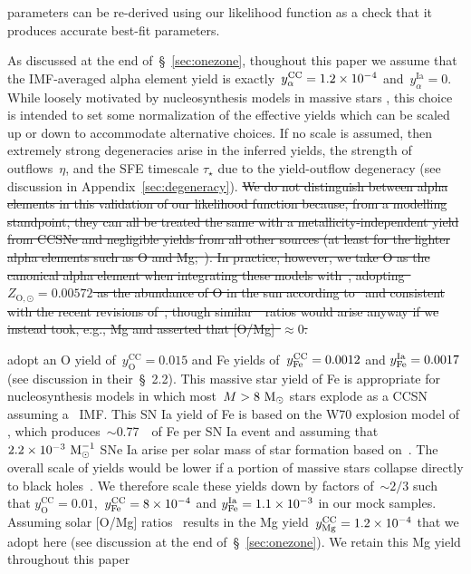 \documentclass[foo.tex]{subfiles}
\begin{document}
parameters can be re-derived using our likelihood function as a check that it
produces accurate best-fit parameters.
\par
As discussed at the end of~\S~\ref{sec:onezone}, thoughout this paper we assume
that the IMF-averaged alpha element yield is exactly~$y_\alpha^\text{CC} = 1.2\times10^{-4}$
and~$y_\alpha^\text{Ia} = 0$.
While loosely motivated by nucleosynthesis models in massive stars
\citep[e.g.,][]{Nomoto2013, Sukhbold2016, Limongi2018}, this choice is intended
to set some normalization of the effective yields which can be scaled up or
down to accommodate alternative choices.
If no scale is assumed, then extremely strong degeneracies arise in the
inferred yields, the strength of outflows~$\eta$, and the SFE timescale
$\tau_\star$ due to the yield-outflow degeneracy (see discussion in
Appendix~\ref{sec:degeneracy}).
{\color{red}
\hypersetup{draft}
\st{
We do not distinguish between alpha elements in this validation of our
likelihood function because, from a modelling standpoint, they can all be
treated the same with a metallicity-independent yield from CCSNe and negligible
yields from all other sources (at least for the lighter alpha elements such as
O and Mg;~\mbox{\citealp{Johnson2019}}).
In practice, however, we take O as the canonical alpha element when integrating
these models with~\vice, adopting~$Z_{\text{O},\odot} = 0.00572$ as the
abundance of O in the sun according to~\mbox{\citet{Asplund2009}} and consistent with
the recent revisions of~\mbox{\citet*{Asplund2021}}, though similar~\afe~ratios would
arise anyway if we instead took, e.g., Mg and asserted that [O/Mg]~$\approx 0$.
}
}
\par
{\color{red}
\citet{Weinberg2017} adopt an O yield of~$y_\text{O}^\text{CC} = 0.015$ and
Fe yields of}~$y_\text{Fe}^\text{CC} = 0.0012$ and
$y_\text{Fe}^\text{Ia} = 0.0017$ (see discussion in their~\S~2.2).
This massive star yield of Fe is appropriate for nucleosynthesis models in
which most~$M > 8~\text{M}_\odot$ stars explode as a CCSN~\citep[e.g.,][]{Woosley1995,
Chieffi2004, Chieffi2013, Nomoto2013} assuming a~\citet{Kroupa2001} IMF.
This SN Ia yield of Fe is based on the W70 explosion model of
\citet{Iwamoto1999}, which produces~$\sim$0.77~\msun~of Fe per SN Ia event and
assuming that~$2.2\times10^{-3}~\text{M}_\odot^{-1}$ SNe Ia arise per solar mass of
star formation based on~\citet{Maoz2012a}.
{\color{red}
The overall scale of yields would be lower if a portion of massive stars
collapse directly to black holes~\citep[e.g.,][]{Ertl2016, Sukhbold2016,
Griffith2022}.
We therefore scale these yields down by factors of~$\sim$$2/3$ such that
$y_\text{O}^\text{CC} = 0.01$,~$y_\text{Fe}^\text{CC} = 8\times10^{-4}$ and
$y_\text{Fe}^\text{Ia} = 1.1\times10^{-3}$ in our mock samples.
Assuming solar [O/Mg] ratios~\citep[e.g.,][]{Weinberg2019} results in the Mg
yield~$y_\text{Mg}^\text{CC} = 1.2\times10^{-4}$ that we adopt here (see
discussion at the end of~\S~\ref{sec:onezone}).
We retain this Mg yield throughout this paper
}
\end{document}
